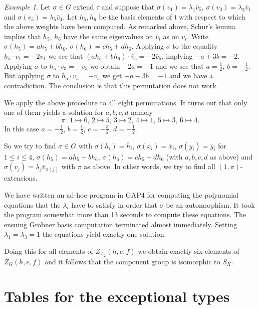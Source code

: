 \documentclass[a4paper,10pt]{amsart}
\newcommand{\mf}{\mathfrak}
\newcommand{\ttt}{\mf{t}}
\numberwithin{equation}{section}
\theoremstyle{remark}
\theoremstyle{remark}
\newtheorem{example}[theorem]{Example}
\begin{document}
\begin{example}
Let $\sigma\in G$ extend $\tau$ and suppose that $\sigma(v_1) = \lambda_1
\bar v_5$, $\sigma(v_3) = \lambda_3 \bar v_1$ and $\sigma(v_5) =
\lambda_5 \bar v_4$. Let $h_5,h_6$ be
the basis elements of $\ttt$ with respect to which the above weights have been
computed. As remarked above, Schur's lemma implies that $h_5$, $h_6$ have
the same eigenvalues on $\bar v_i$ as on $v_i$.
Write $\sigma(h_5) = ah_5+bh_6$, $\sigma(h_6) = ch_5+dh_6$.
Applying $\sigma$ to the equality $h_5\cdot v_1 = -2v_1$ we see that
$(ah_5+bh_6)\cdot \bar v_5 =-2\bar v_5$, implying $-a+3b=-2$. Applying
$\sigma$ to $h_5\cdot v_3 = -v_3$ we obtain $-2a=-1$ and we see that
$a=\tfrac{1}{2}$, $b=-\tfrac{1}{2}$. But applying $\sigma$ to $h_5\cdot v_5=
-v_5$ we get $-a-3b=-1$ and we have a contradiction. The conclusion is that
this permutation does not work.

We apply the above procedure to all eight permutations. It turns out that only
one of them yields a solution for $a,b,c,d$ namely
$$\pi:~ 1\mapsto 6,\, 2\mapsto 5,\, 3\mapsto 2,\, 4\mapsto 1,\, 5\mapsto 3,\,
6\mapsto 4.$$
In this case $a=-\tfrac{1}{2}$, $b=\tfrac{1}{2}$, $c=-\tfrac{3}{2}$,
$d=-\tfrac{1}{2}$.

So we try to find $\sigma\in G$ with $\sigma(h_i)=\bar h_i$,
$\sigma(x_i)=\bar x_i$, $\sigma(y_i) = \bar y_i$ for $1\leq i\leq 4$,
$\sigma(h_5) = ah_5+bh_6$, $\sigma(h_6) = ch_5+dh_6$ (with $a,b,c,d$ as above)
and $\sigma(v_j) = \lambda_j \bar v_{\pi(j)}$ with $\pi$ as above. In other
words, we try to find all $(1,\pi)$-extensions. 

We have written an ad-hoc program in {\sf GAP}4 for computing the polynomial
equations that the $\lambda_i$ have to satisfy in order that $\sigma$ be
an automorphism. It took the program somewhat more than 13 seconds to compute
these equations. The ensuing Gr\"obner basis computation terminated almost
immediately. Setting $\lambda_1= \lambda_3=1$ the equations yield exactly
one solution.

Doing this for all elements of $Z_{A_2}(h,e,f)$ we obtain exactly six elements
of $Z_G(h,e,f)$ and it follows that the component group is isomorphic to
$S_X$. 
\end{example}

\section{Tables for the exceptional types}\label{sec:tables}
\end{document}
